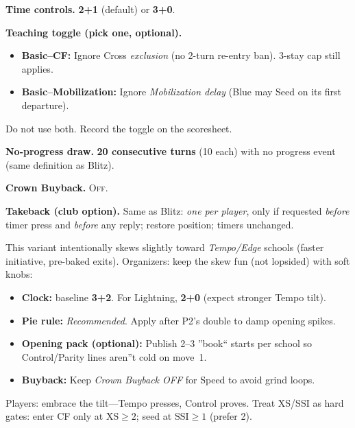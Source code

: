 \documentclass[11pt]{article}
\begin{document}
\bigskip
\begin{rulevariant}[title={Lightning Canray (Bullet)}]
\small
\textbf{Time controls.} \textbf{2+1} (default) or \textbf{3+0}.

\textbf{Teaching toggle (pick one, optional).}
\begin{itemize}\itemsep=0.2em
  \item \textbf{Basic--CF:} Ignore Cross \emph{exclusion} (no 2-turn re-entry ban). 3-stay cap still applies.
  \item \textbf{Basic--Mobilization:} Ignore \emph{Mobilization delay} (Blue may Seed on its first departure).
\end{itemize}
Do not use both. Record the toggle on the scoresheet.

\textbf{No-progress draw.} \textbf{20 consecutive turns} (10 each) with no progress event (same definition as Blitz).

\textbf{Crown Buyback.} \textsc{Off}.

\textbf{Takeback (club option).} Same as Blitz: \emph{one per player}, only if requested \emph{before} timer press and \emph{before} any reply; restore position; timers  unchanged.
\end{rulevariant}

\bigskip

\begin{rulevariant}[title={Speed Canray --- Meta Note}]
This variant intentionally skews slightly toward \emph{Tempo/Edge} schools (faster initiative, pre-baked exits).
Organizers: keep the skew fun (not lopsided) with soft knobs:
\begin{itemize}\itemsep0.2em
  \item \textbf{Clock:} baseline \textbf{3+2}. For Lightning, \textbf{2+0} (expect stronger Tempo tilt).
  \item \textbf{Pie rule:} \emph{Recommended}. Apply after P2's double to damp opening spikes.
  \item \textbf{Opening pack (optional):} Publish 2--3 ''book`` starts per school so Control/Parity lines aren''t cold on move~1.
  \item \textbf{Buyback:} Keep \emph{Crown Buyback OFF} for Speed to avoid grind loops.
\end{itemize}
Players: embrace the tilt---Tempo presses, Control proves. Treat XS/SSI as hard gates: enter CF only at \(\mathrm{XS}\ge2\); seed at \(\mathrm{SSI}\ge1\) (prefer 2).
\end{rulevariant}
\end{document}
